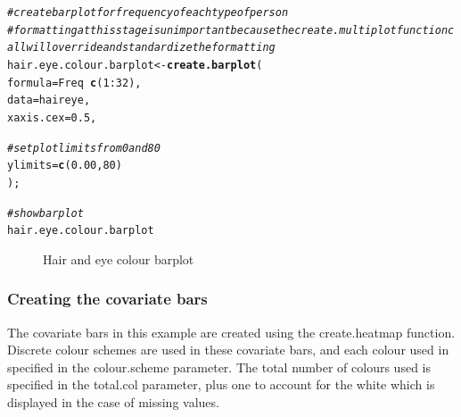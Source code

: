 \documentclass[letterpaper]{report}\usepackage[]{graphicx}\usepackage[]{color}
\makeatletter
\newcommand{\hlnum}[1]{\textcolor[rgb]{0.686,0.059,0.569}{#1}}%
\newcommand{\hlcom}[1]{\textcolor[rgb]{0.678,0.584,0.686}{\textit{#1}}}%
\newcommand{\hlopt}[1]{\textcolor[rgb]{0,0,0}{#1}}%
\newcommand{\hlstd}[1]{\textcolor[rgb]{0.345,0.345,0.345}{#1}}%
\newcommand{\hlkwb}[1]{\textcolor[rgb]{0.69,0.353,0.396}{#1}}%
\newcommand{\hlkwc}[1]{\textcolor[rgb]{0.333,0.667,0.333}{#1}}%
\newcommand{\hlkwd}[1]{\textcolor[rgb]{0.737,0.353,0.396}{\textbf{#1}}}%
\newenvironment{kframe}{%
 \def\at@end@of@kframe{}%
 \ifinner\ifhmode%
  \def\at@end@of@kframe{\end{minipage}}%
  \begin{minipage}{\columnwidth}%
 \fi\fi%
 \def\FrameCommand##1{\hskip\@totalleftmargin \hskip-\fboxsep
 \colorbox{shadecolor}{##1}\hskip-\fboxsep
     \hskip-\linewidth \hskip-\@totalleftmargin \hskip\columnwidth}%
 \MakeFramed {\advance\hsize-\width
   \@totalleftmargin\z@ \linewidth\hsize
   \@setminipage}}%
 {\par\unskip\endMakeFramed%
 \at@end@of@kframe}
\newenvironment{knitrout}{}{} %
\makeatother
\begin{document}
\begin{knitrout}
\color{fgcolor}\begin{kframe}
\begin{alltt}
\hlcom{# create barplot for frequency of each type of person}
\hlcom{# formatting at this stage is unimportant because the create.multiplot function call will override and standardize the formatting}
\hlstd{hair.eye.colour.barplot} \hlkwb{<-} \hlkwd{create.barplot}\hlstd{(}
        \hlkwc{formula} \hlstd{= Freq} \hlopt{~} \hlkwd{c}\hlstd{(}\hlnum{1}\hlopt{:}\hlnum{32}\hlstd{),}
        \hlkwc{data} \hlstd{= haireye,}
                \hlkwc{xaxis.cex} \hlstd{=} \hlnum{0.5}\hlstd{,}

        \hlcom{# set plot limits from 0 and 80 }
        \hlkwc{ylimits} \hlstd{=} \hlkwd{c}\hlstd{(}\hlnum{0.00}\hlstd{,} \hlnum{80}\hlstd{)}
        \hlstd{);}

\hlcom{# show barplot}
\hlstd{hair.eye.colour.barplot}
\end{alltt}
\end{kframe}\begin{figure}

{\centering {} 

}

\caption[Hair and eye colour barplot]{Hair and eye colour barplot}\label{fig:multiplotex1_barplot}
\end{figure}


\end{knitrout}

\subsubsection{Creating the covariate bars}
The covariate bars in this example are created using the create.heatmap function.  Discrete colour schemes are used in these covariate bars, and each colour used in specified in the colour.scheme parameter. The total number of colours used is specified in the total.col parameter, plus one to account for the white which is displayed in the case of missing values.
\end{document}
